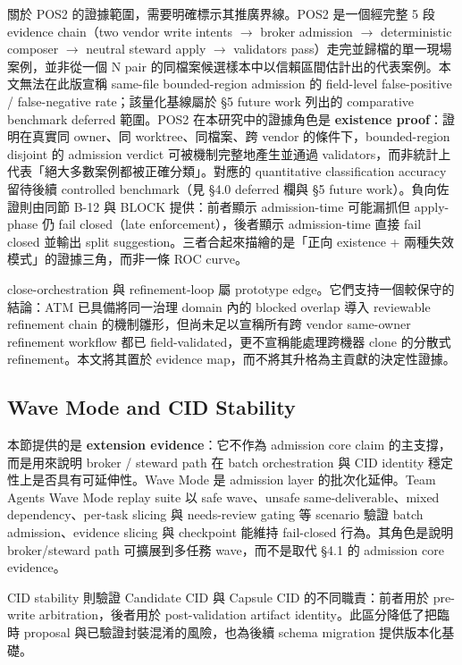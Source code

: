 \documentclass[a4paper,fontset=none]{ctexart}
\begin{document}
關於 POS2 的證據範圍，需要明確標示其推廣界線。POS2 是一個經完整 5 段 evidence chain（two vendor write intents $\rightarrow$ broker admission $\rightarrow$ deterministic composer $\rightarrow$ neutral steward apply $\rightarrow$ validators pass）走完並歸檔的單一現場案例，並非從一個 N pair 的同檔案候選樣本中以信賴區間估計出的代表案例。本文無法在此版宣稱 same-file bounded-region admission 的 field-level false-positive / false-negative rate；該量化基線屬於 §5 future work 列出的 comparative benchmark deferred 範圍。POS2 在本研究中的證據角色是 \textbf{existence proof}：證明在真實同 owner、同 worktree、同檔案、跨 vendor 的條件下，bounded-region disjoint 的 admission verdict 可被機制完整地產生並通過 validators，而非統計上代表「絕大多數案例都被正確分類」。對應的 quantitative classification accuracy 留待後續 controlled benchmark（見 §4.0 deferred 欄與 §5 future work）。負向佐證則由同節 B-12 與 BLOCK 提供：前者顯示 admission-time 可能漏抓但 apply-phase 仍 fail closed（late enforcement），後者顯示 admission-time 直接 fail closed 並輸出 split suggestion。三者合起來描繪的是「正向 existence + 兩種失效模式」的證據三角，而非一條 ROC curve。

close-orchestration 與 refinement-loop 屬 prototype edge。它們支持一個較保守的結論：ATM 已具備將同一治理 domain 內的 blocked overlap 導入 reviewable refinement chain 的機制雛形，但尚未足以宣稱所有跨 vendor same-owner refinement workflow 都已 field-validated，更不宣稱能處理跨機器 clone 的分散式 refinement。本文將其置於 evidence map，而不將其升格為主貢獻的決定性證據。

\subsection{Wave Mode and CID Stability}

本節提供的是 \textbf{extension evidence}：它不作為 admission core claim 的主支撐，而是用來說明 broker / steward path 在 batch orchestration 與 CID identity 穩定性上是否具有可延伸性。Wave Mode 是 admission layer 的批次化延伸。Team Agents Wave Mode replay suite 以 safe wave、unsafe same-deliverable、mixed dependency、per-task slicing 與 needs-review gating 等 scenario 驗證 batch admission、evidence slicing 與 checkpoint 能維持 fail-closed 行為。其角色是說明 broker/steward path 可擴展到多任務 wave，而不是取代 §4.1 的 admission core evidence。

CID stability 則驗證 Candidate CID 與 Capsule CID 的不同職責：前者用於 pre-write arbitration，後者用於 post-validation artifact identity。此區分降低了把臨時 proposal 與已驗證封裝混淆的風險，也為後續 schema migration 提供版本化基礎。
\end{document}

